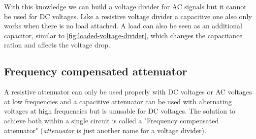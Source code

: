 With this knowledge we can build a voltage divider for AC signals but it cannot be used for DC voltages. Like a resistive voltage divider a capacitive one also only works when there is no load attached. A load can also be seen as an additional capacitor, similar to \cref{fig:loaded-voltage-divider}, which changes the capacitance ration and affects the voltage drop.

\subsection{Frequency compensated attenuator}

A resistive attenuator can only be used properly with DC voltages or AC voltages at low frequencies and a capacitive attenuator can be used with alternating voltages at high frequencies but is unusable for DC voltages. The solution to achieve both within a single circuit is called a "Frequency compensated attenuator" (\textit{attenuator} is just another name for a voltage divider).

